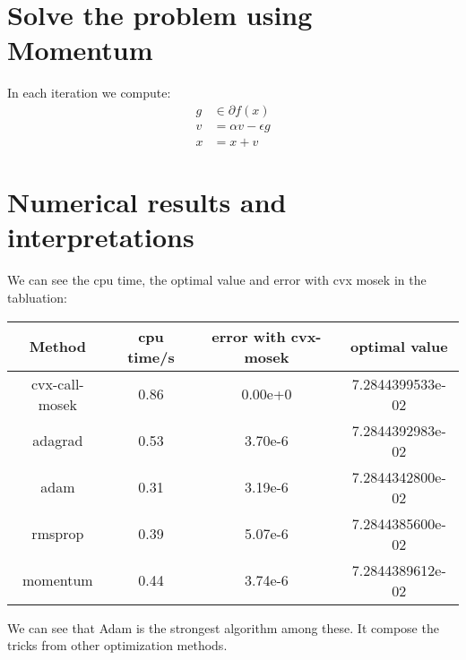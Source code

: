 \documentclass[11pt, oneside]{article}   	%
\begin{document}
\section{Solve the problem using Momentum}
In each iteration we compute:
\begin{align} 
g & \in \partial f(x)\\
v & = \alpha v - \epsilon g\\
x & = x  + v
\end{align}

\section{Numerical results and interpretations}
We can see the cpu time, the optimal value and error with cvx mosek in the tabluation:

\begin{table}[H]
  \centering
  \begin{tabular}{c|ccc}
  \hline
  Method&cpu time/s&error with cvx-mosek&optimal value\\
  \hline
  cvx-call-mosek&0.86&0.00e+0&7.2844399533e-02\\
  adagrad&0.53&3.70e-6&7.2844392983e-02\\
  adam&0.31&3.19e-6&7.2844342800e-02\\
  rmsprop&0.39&5.07e-6&7.2844385600e-02\\
  momentum&0.44&3.74e-6&7.2844389612e-02\\
  \hline
  \end{tabular}
\end{table}


We can see that Adam is the strongest algorithm among these. It compose the tricks from other optimization methods.
\end{document}
